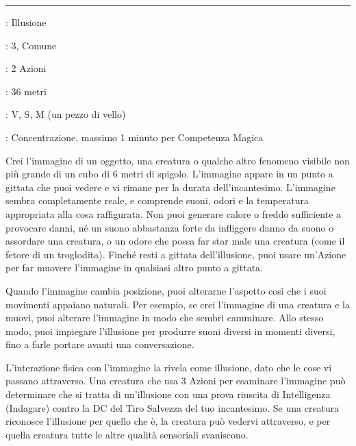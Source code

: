 \begin{multicols}{2}
\smallskip\noindent\rule{\linewidth}{2pt} \hypertarget{Immagine Maggiore}{}\medskip{}
\noindent
\begin{description}[noitemsep, topsep=0pt, parsep=0pt, partopsep=0pt, leftmargin=0cm, labelwidth=2.8cm]
	\item[\textbf{Lista di Magia}]: Illusione
	\item[\textbf{Livello}]: 3, Comune
	\item[\textbf{T. di Lancio}]: 2 Azioni
	\item[\textbf{Gittata}]: 36 metri
	\item[\textbf{Componenti}]: V, S, M (un pezzo di vello)
	\item[\textbf{Durata}]: Concentrazione, massimo 1 minuto per Competenza Magica
\end{description}

Crei l'immagine di un oggetto, una creatura o qualche altro fenomeno visibile non più grande di un cubo di 6 metri di spigolo. L'immagine appare in un punto a gittata che puoi vedere e vi rimane per la durata dell'incantesimo. L'immagine sembra completamente reale, e comprende suoni, odori e la temperatura appropriata alla cosa raffigurata. Non puoi generare calore o freddo sufficiente a provocare danni, né un suono abbastanza forte da infliggere danno da suono o assordare una creatura, o un odore che possa far star male una creatura (come il fetore di un troglodita). Finché resti a gittata dell'illusione, puoi usare un'Azione per far muovere l'immagine in qualsiasi altro punto a gittata.

Quando l'immagine cambia posizione, puoi alterarne l'aspetto così che i suoi movimenti appaiano naturali. Per esempio, se crei l'immagine di una creatura e la muovi, puoi alterare l'immagine in modo che sembri camminare. Allo stesso modo, puoi impiegare l'illusione per produrre suoni diversi in momenti diversi, fino a farle portare avanti una conversazione.

L'interazione fisica con l'immagine la rivela come illusione, dato che le cose vi passano attraverso. Una creatura che usa 3 Azioni per esaminare l'immagine può determinare che si tratta di un'illusione con una prova riuscita di Intelligenza (Indagare) contro la DC del Tiro Salvezza del tuo incantesimo. Se una creatura riconosce l'illusione per quello che è, la creatura può vedervi attraverso, e per quella creatura tutte le altre qualità sensoriali svaniscono.


\end{multicols}
